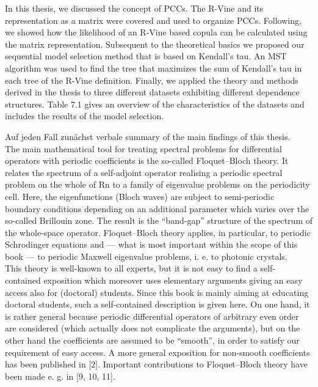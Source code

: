In this thesis, we discussed the concept of PCCs. The R-Vine and its representation as a
matrix were covered and used to organize PCCs. Following, we showed how the likelihood
of an R-Vine based copula can be calculated using the matrix representation. Subsequent
to the theoretical basics we proposed our sequential model selection method that is based
on Kendall’s tau. An MST algorithm was used to find the tree that maximizes the sum
of Kendall’s tau in each tree of the R-Vine definition. Finally, we applied the theory and
methods derived in the thesis to three different datasets exhibiting different dependence
structures. Table 7.1 gives an overview of the characteristics of the datasets and includes
the results of the model selection.	
	
Auf jeden Fall zunächst verbale summary of the main findings of this thesis.	
~\\
	
The main mathematical tool for treating spectral problems for differential operators with periodic coefficients is the so-called Floquet–Bloch theory. It relates the spectrum of a self-adjoint operator realising a periodic spectral problem on the whole of Rn to a family of eigenvalue problems on the periodicity cell. Here, the eigenfunctions (Bloch waves) are subject to semi-periodic boundary conditions depending on an additional parameter which varies over the so-called Brillouin zone. The result is the “band-gap” structure of the spectrum of the whole-space operator. Floquet–Bloch theory applies, in particular, to periodic Schrodinger equations and — what is most important within the scope of this book — to periodic Maxwell eigenvalue problems, i. e. to photonic crystals.
~\\

This theory is well-known to all experts, but it is not easy to find a self- contained exposition which moreover uses elementary arguments giving an easy access also for (doctoral) students. Since this book is mainly aiming at educating doctoral students, such a self-contained description is given here. On one hand, it is rather general because periodic differential operators of arbitrary even order are considered (which actually does not complicate the arguments), but on the other hand the coefficients are assumed to be “smooth”, in order to satisfy our requirement of easy access. A more general exposition for non-smooth coefficients has been published in [2]. Important contributions to Floquet–Bloch theory have been made e. g. in [9, 10, 11].
~\\

